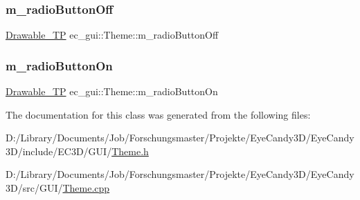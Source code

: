 \mbox{\label{classec__gui_1_1_theme_a17440ed33f45c710bcb182798ab84a18}} 
\subsubsection{\texorpdfstring{m\+\_\+radio\+Button\+Off}{m\_radioButtonOff}}
{\footnotesize\ttfamily \mbox{\hyperlink{classec__gui_1_1_theme_a91d9c5c68bc50cc0f1470d141a6a231b}{Drawable\+\_\+\+TP}} ec\+\_\+gui\+::\+Theme\+::m\+\_\+radio\+Button\+Off}

\mbox{\label{classec__gui_1_1_theme_a1251e17fe9288485f2a63fedd0bb4871}} 
\subsubsection{\texorpdfstring{m\+\_\+radio\+Button\+On}{m\_radioButtonOn}}
{\footnotesize\ttfamily \mbox{\hyperlink{classec__gui_1_1_theme_a91d9c5c68bc50cc0f1470d141a6a231b}{Drawable\+\_\+\+TP}} ec\+\_\+gui\+::\+Theme\+::m\+\_\+radio\+Button\+On}



The documentation for this class was generated from the following files\+:\begin{DoxyCompactItemize}
\item 
D\+:/\+Library/\+Documents/\+Job/\+Forschungsmaster/\+Projekte/\+Eye\+Candy3\+D/\+Eye\+Candy3\+D/include/\+E\+C3\+D/\+G\+U\+I/\mbox{\hyperlink{_theme_8h}{Theme.\+h}}\item 
D\+:/\+Library/\+Documents/\+Job/\+Forschungsmaster/\+Projekte/\+Eye\+Candy3\+D/\+Eye\+Candy3\+D/src/\+G\+U\+I/\mbox{\hyperlink{_theme_8cpp}{Theme.\+cpp}}\end{DoxyCompactItemize}
